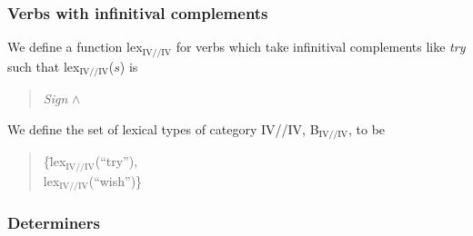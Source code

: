 {\subsubsection{Verbs with infinitival complements}

We define a function lex$_{\mathrm{IV//IV}}$ for verbs which take
infinitival complements like
\textit{try}  such that
lex$_{\mathrm{IV//IV}}$($s$) is
\begin{quote}
\textit{Sign} \d{$\wedge$} \\

\end{quote}

We define the set of lexical types of category IV//IV,
B$_{\mathrm{IV//IV}}$, to be
\begin{quote}
\begin{tabbing}
\{\=lex$_{\mathrm{IV//IV}}$(``try''), \\
  \>lex$_{\mathrm{IV//IV}}$(``wish'')\}
\end{tabbing}
\end{quote}
}

\subsubsection{Determiners}

